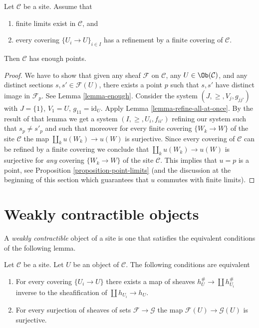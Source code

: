 \begin{proposition}
\label{proposition-criterion-points}
Let $\mathcal{C}$ be a site. Assume that
\begin{enumerate}
\item finite limits exist in $\mathcal{C}$, and
\item every covering $\{U_i \to U\}_{i \in I}$
has a refinement by a finite covering of $\mathcal{C}$.
\end{enumerate}
Then $\mathcal{C}$ has enough points.
\end{proposition}

\begin{proof}
We have to show that given any sheaf
$\mathcal{F}$ on $\mathcal{C}$, any $U \in \Ob(\mathcal{C})$,
and any distinct sections $s, s' \in \mathcal{F}(U)$, there exists
a point $p$ such that $s, s'$ have distinct image in
$\mathcal{F}_p$. See Lemma \ref{lemma-enough}.
Consider the system $(J, \geq, V_j, g_{jj'})$
with $J = \{1\}$, $V_1 = U$, $g_{11} = \text{id}_U$.
Apply Lemma \ref{lemma-refine-all-at-once}.
By the result of that lemma we get a system
$(I, \geq, U_i, f_{ii'})$ refining our system such
that $s_p \not = s'_p$ and such that moreover for every
finite covering $\{W_k \to W\}$ of the site $\mathcal{C}$ the map
$\coprod_k u(W_k) \to u(W)$ is surjective.
Since every covering of $\mathcal{C}$ can be refined by
a finite covering we conclude that
$\coprod_k u(W_k) \to u(W)$ is surjective for {\it any}
covering $\{W_k \to W\}$ of the site $\mathcal{C}$.
This implies that $u = p$ is a point, see
Proposition \ref{proposition-point-limits} (and the discussion
at the beginning of this section which guarantees that $u$
commutes with finite limits).
\end{proof}





\section{Weakly contractible objects}
\label{section-w-contractible}

\noindent
A {\it weakly contractible} object of a site is one that satisfies
the equivalent conditions of the following lemma.

\begin{lemma}
\label{lemma-w-contractible}
Let $\mathcal{C}$ be a site. Let $U$ be an object of $\mathcal{C}$.
The following conditions are equivalent
\begin{enumerate}
\item For every covering $\{U_i \to U\}$ there exists a map of
sheaves $h_U^\# \to \coprod h_{U_i}^\#$ inverse to the sheafification
of $\coprod h_{U_i} \to h_U$.
\item For every surjection of sheaves of sets $\mathcal{F} \to \mathcal{G}$
the map $\mathcal{F}(U) \to \mathcal{G}(U)$ is surjective.
\end{enumerate}
\end{lemma}

